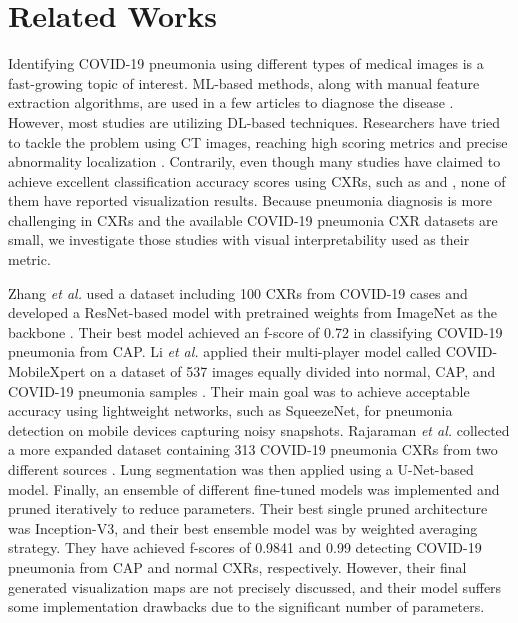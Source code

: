 \documentclass{article}
\begin{document}
\section{Related Works} \label{related_works}
Identifying COVID-19 pneumonia using different types of medical images is a fast-growing topic of interest. ML-based methods, along with manual feature extraction algorithms, are used in a few articles to diagnose the disease \cite{barstugan2020coronavirus, hassanien2020automatic, dey2020social, al2020ai, gomes2020ikonos}. However, most studies are utilizing DL-based techniques. Researchers have tried to tackle the problem using CT images, reaching high scoring metrics and precise abnormality localization \cite{shan+2020lung, gozes2020rapid}. Contrarily, even though many studies have claimed to achieve excellent classification accuracy scores using CXRs, such as \cite{pereira2020covid} and \cite{khan2020coronet}, none of them have reported visualization results. Because pneumonia diagnosis is more challenging in CXRs and the available COVID-19 pneumonia CXR datasets are small, we investigate those studies with visual interpretability used as their metric.

Zhang \textit{et al.} used a dataset including 100 CXRs from COVID-19 cases and developed a ResNet-based model with pretrained weights from ImageNet as the backbone \cite{zhang2020covid}. Their best model achieved an f-score of  0.72 in classifying COVID-19 pneumonia from CAP. Li \textit{et al.} applied their multi-player model called COVID-MobileXpert on a dataset of 537 images equally divided into normal, CAP, and COVID-19 pneumonia samples \cite{li2020covidmobilexpert}. Their main goal was to achieve acceptable accuracy using lightweight networks, such as SqueezeNet, for pneumonia detection on mobile devices capturing noisy snapshots. Rajaraman \textit{et al.} collected a more expanded dataset containing 313 COVID-19 pneumonia CXRs from two different sources \cite{rajaraman2020iteratively}. Lung segmentation was then applied using a U-Net-based model. Finally, an ensemble of different fine-tuned models was implemented and pruned iteratively to reduce parameters. Their best single pruned architecture was Inception-V3, and their best ensemble model was by weighted averaging strategy. They have achieved f-scores of 0.9841 and 0.99 detecting COVID-19 pneumonia from CAP and normal CXRs, respectively. However, their final generated visualization maps are not precisely discussed, and their model suffers some implementation drawbacks due to the significant number of parameters.
\end{document}
